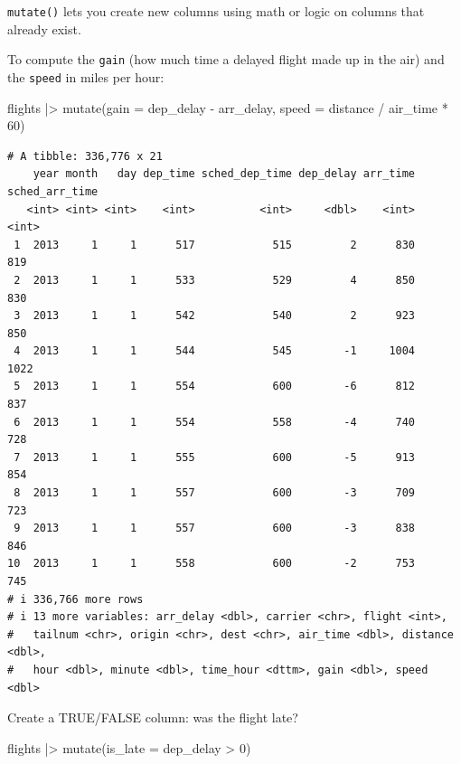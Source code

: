 \documentclass[
  letterpaper,
  DIV=11,
  numbers=noendperiod]{scrreprt}
\newenvironment{Shaded}{\begin{snugshade}}{\end{snugshade}}
\newcommand{\AttributeTok}[1]{\textcolor[rgb]{0.40,0.45,0.13}{#1}}
\newcommand{\DecValTok}[1]{\textcolor[rgb]{0.68,0.00,0.00}{#1}}
\newcommand{\FunctionTok}[1]{\textcolor[rgb]{0.28,0.35,0.67}{#1}}
\newcommand{\NormalTok}[1]{\textcolor[rgb]{0.00,0.23,0.31}{#1}}
\newcommand{\SpecialCharTok}[1]{\textcolor[rgb]{0.37,0.37,0.37}{#1}}
\begin{document}
\texttt{mutate()} lets you create new columns using math or logic on
columns that already exist.

To compute the \texttt{gain} (how much time a delayed flight made up in
the air) and the \texttt{speed} in miles per hour:

\begin{Shaded}
\begin{Highlighting}[]
\NormalTok{flights }\SpecialCharTok{|\textgreater{}}
  \FunctionTok{mutate}\NormalTok{(}\AttributeTok{gain =}\NormalTok{ dep\_delay }\SpecialCharTok{{-}}\NormalTok{ arr\_delay,}
         \AttributeTok{speed =}\NormalTok{ distance }\SpecialCharTok{/}\NormalTok{ air\_time }\SpecialCharTok{*} \DecValTok{60}\NormalTok{)}
\end{Highlighting}
\end{Shaded}

\begin{verbatim}
# A tibble: 336,776 x 21
    year month   day dep_time sched_dep_time dep_delay arr_time sched_arr_time
   <int> <int> <int>    <int>          <int>     <dbl>    <int>          <int>
 1  2013     1     1      517            515         2      830            819
 2  2013     1     1      533            529         4      850            830
 3  2013     1     1      542            540         2      923            850
 4  2013     1     1      544            545        -1     1004           1022
 5  2013     1     1      554            600        -6      812            837
 6  2013     1     1      554            558        -4      740            728
 7  2013     1     1      555            600        -5      913            854
 8  2013     1     1      557            600        -3      709            723
 9  2013     1     1      557            600        -3      838            846
10  2013     1     1      558            600        -2      753            745
# i 336,766 more rows
# i 13 more variables: arr_delay <dbl>, carrier <chr>, flight <int>,
#   tailnum <chr>, origin <chr>, dest <chr>, air_time <dbl>, distance <dbl>,
#   hour <dbl>, minute <dbl>, time_hour <dttm>, gain <dbl>, speed <dbl>
\end{verbatim}

Create a TRUE/FALSE column: was the flight late?

\begin{Shaded}
\begin{Highlighting}[]
\NormalTok{flights }\SpecialCharTok{|\textgreater{}}
  \FunctionTok{mutate}\NormalTok{(}\AttributeTok{is\_late =}\NormalTok{ dep\_delay }\SpecialCharTok{\textgreater{}} \DecValTok{0}\NormalTok{)}
\end{Highlighting}
\end{Shaded}
\end{document}
